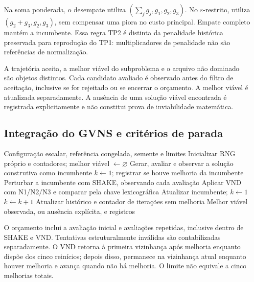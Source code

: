 Na soma ponderada, o desempate utiliza $(\sum_jg_j,g_1,g_2,g_3)$.
No $\varepsilon$-restrito, utiliza $(g_2+g_3,g_2,g_3)$, sem compensar
uma piora no custo principal. Empate completo mantém a incumbente.
Essa regra TP2 é distinta da penalidade histórica preservada para reprodução
do TP1: multiplicadores de penalidade não são referências de normalização.

A trajetória aceita, a melhor viável do subproblema e o arquivo não dominado
são objetos distintos. Cada candidato avaliado é observado antes do filtro
de aceitação, inclusive se for rejeitado ou se encerrar o orçamento. A melhor
viável é atualizada separadamente. A ausência de uma solução viável encontrada
é registrada explicitamente e não constitui prova de inviabilidade matemática.

\subsection{Integração do GVNS e critérios de parada}

\begin{algorithm}[H]
\caption{GVNS escalar com observação e orçamento comum}
\label{alg:gvns_multiobjetivo}
\begin{algorithmic}[1]
\Require Configuração escalar, referência congelada, semente e limites
\State Inicializar RNG próprio e contadores; melhor viável $\gets\varnothing$
\State Gerar, avaliar e observar a solução construtiva como incumbente
  \State $k\gets1$; registrar se houve melhoria da incumbente
    \State Perturbar a incumbente com SHAKE, observando cada avaliação
    \State Aplicar VND com N1/N2/N3 e comparar pela chave lexicográfica
      \State Atualizar incumbente; $k\gets1$
    \Else
      \State $k\gets k+1$
    \EndIf
  \EndWhile
  \State Atualizar histórico e contador de iterações sem melhoria
\EndWhile
\State \Return Melhor viável observada, ou ausência explícita, e registros
\end{algorithmic}
\end{algorithm}

O orçamento inclui a avaliação inicial e avaliações repetidas, inclusive
dentro de SHAKE e VND. Tentativas estruturalmente inválidas são contabilizadas
separadamente. O VND retorna à primeira vizinhança após melhoria enquanto
dispõe dos cinco reinícios; depois disso, permanece na vizinhança atual
enquanto houver melhoria e avança quando não há melhoria. O limite não
equivale a cinco melhorias totais.

